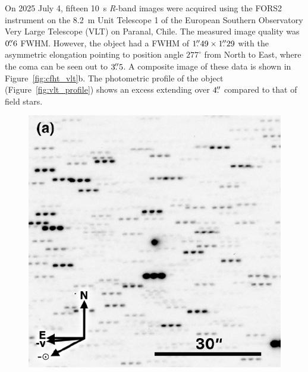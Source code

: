 \documentclass[twocolumn,longbib]{aastex7}
\begin{document}
\begin{CJK*}{UTF8}{gbsn}
On 2025 July 4, fifteen 10~s \textit{R}-band images were acquired using the FORS2 instrument on the 8.2~m Unit Telescope 1 of the European Southern Observatory Very Large Telescope (VLT) on Paranal, Chile. The measured image quality was $0\mbox{$.\!\!^{\prime\prime}$}6$ FWHM. However, the object had a FWHM of $1\mbox{$.\!\!^{\prime\prime}$}49 \times 1\mbox{$.\!\!^{\prime\prime}$}29$ with the asymmetric elongation pointing to position angle $277^{\circ}$ from North to East, where the coma can be seen out to $3\mbox{$.\!\!^{\prime\prime}$}5$. A composite image of these data is shown in Figure~\ref{fig:cfht_vlt}b.
The photometric profile of the object (Figure~\ref{fig:vlt_profile}) shows an excess extending over $4\mbox{$.\!\!^{\prime\prime}$}$ compared to that of field stars.

\begin{figure}
    \includegraphics[width=1.\linewidth]{static/3I_cfht_invert_annotated.pdf}

\end{figure}
\end{CJK*}
\end{document}
